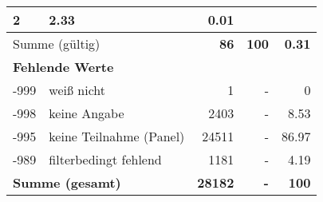 \begin{longtable}{lXrrr}
       \num{2} &
       \num[round-mode=places,round-precision=2]{2,33} &
         \num[round-mode=places,round-precision=2]{0,01} \\
     \midrule
     \multicolumn{2}{l}{Summe (gültig)} &
       \textbf{\num{86}} &
     \textbf{100} &
       \textbf{\num[round-mode=places,round-precision=2]{0,31}} \\
     \multicolumn{5}{l}{\textbf{Fehlende Werte}}\\
       -999 &
       weiß nicht &
         \num{1} &
        - &
         \num[round-mode=places,round-precision=2]{0} \\
       -998 &
       keine Angabe &
         \num{2403} &
        - &
         \num[round-mode=places,round-precision=2]{8,53} \\
       -995 &
       keine Teilnahme (Panel) &
         \num{24511} &
        - &
         \num[round-mode=places,round-precision=2]{86,97} \\
       -989 &
       filterbedingt fehlend &
         \num{1181} &
        - &
         \num[round-mode=places,round-precision=2]{4,19} \\
     \midrule
     \multicolumn{2}{l}{\textbf{Summe (gesamt)}} &
          \textbf{\num{28182}} &
        \textbf{-} &
        \textbf{100} \\
     \bottomrule
     \end{longtable}
     
